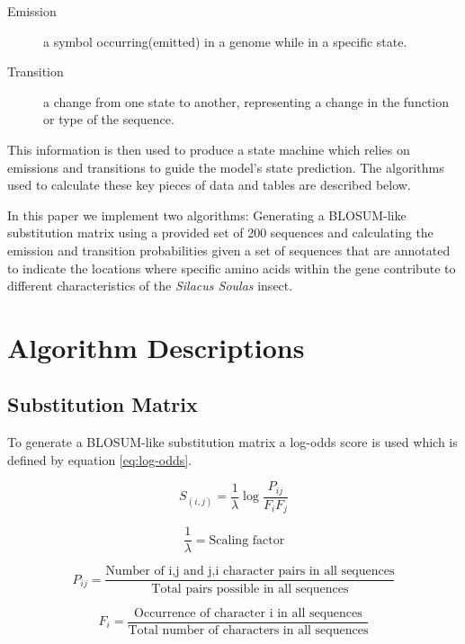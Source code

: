 \documentclass[a4paper,11pt]{article}
\begin{document}
\begin{description}
    \item[Emission] a symbol occurring(emitted) in a genome while in a specific state.
    \item[Transition] a change from one state to another, representing a change in the function or type of the sequence.
\end{description}

This information is then used to produce a state machine which relies on emissions and transitions to guide the model's state prediction. The algorithms used to calculate these key pieces of data and tables are described below.

In this paper we implement two algorithms: Generating a BLOSUM-like substitution matrix using a provided set of 200 sequences and calculating the emission and transition probabilities given a set of sequences that are annotated to indicate the locations where specific amino acids within the gene contribute to different characteristics of the \textit{Silacus Soulas} insect.


\section{Algorithm Descriptions}

\subsection{Substitution Matrix}

To generate a BLOSUM-like substitution matrix a log-odds score is used which is defined by equation \ref{eq:log-odds}.

\begin{equation}
	\label{eq:log-odds}
	{S_{(i,j)}} = {\frac{1}{\lambda}} \log \frac{P_{ij}}{F_i F_j}
\end{equation}

\begin{equation}
	\label{eq:scaling factor}
	{\frac{1}{\lambda}} = \text{Scaling factor}
\end{equation}

\begin{equation}
	\label{eq:prob-pairs}
	{P_{ij}} = \frac{\text{Number of i,j and j,i character pairs in all sequences}}{\text{Total pairs possible in all sequences}}
\end{equation}

\begin{equation}
	\label{eq:prob-frequencyi}
	{F_{i}} = \frac{\text{Occurrence of character i in all sequences}} {\text{Total number of characters in all sequences}}
\end{equation}
\end{document}
